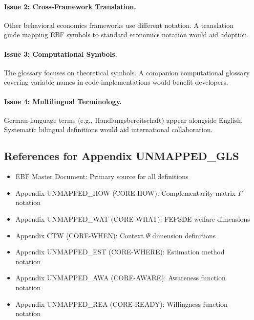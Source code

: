\paragraph{Issue 2: Cross-Framework Translation.}
Other behavioral economics frameworks use different notation. A translation guide
mapping EBF symbols to standard economics notation would aid adoption.

\paragraph{Issue 3: Computational Symbols.}
The glossary focuses on theoretical symbols. A companion computational glossary
covering variable names in code implementations would benefit developers.

\paragraph{Issue 4: Multilingual Terminology.}
German-language terms (e.g., Handlungsbereitschaft) appear alongside English.
Systematic bilingual definitions would aid international collaboration.


\subsection{References for Appendix UNMAPPED_GLS}
\label{sec:glossary-references}

\begin{itemize}[nosep]
    \item EBF Master Document: Primary source for all definitions
    \item Appendix UNMAPPED_HOW (CORE-HOW): Complementarity matrix $\Gamma$ notation
    \item Appendix UNMAPPED_WAT (CORE-WHAT): FEPSDE welfare dimensions
    \item Appendix CTW (CORE-WHEN): Context $\Psi$ dimension definitions
    \item Appendix UNMAPPED_EST (CORE-WHERE): Estimation method notation
    \item Appendix UNMAPPED_AWA (CORE-AWARE): Awareness function notation
    \item Appendix UNMAPPED_REA (CORE-READY): Willingness function notation
\end{itemize}

